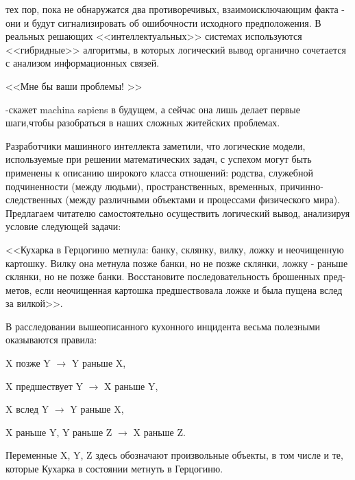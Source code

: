 \hspace{0.3cm}
\begin{minipage}{0.3\textwidth}

тех пор, пока не обнаружатся два противоречивых, взаимоисключающим факта -
они и будут сигнализировать об ошибочности исходного предположения.
  В реальных решающих <<интеллектуальных>> системах используются <<гибридные>> алгоритмы, в которых логический вывод органично сочетается с анализом информационных связей.

\vspace{0.3cm}
\hline
\vspace{0.09cm}
\large{
<<Мне бы ваши проблемы! >>
}
\hline
\vspace{0.15cm}

\small
\hspace{0.1cm}  -скажет machina sapiens в будущем, а сейчас она лишь делает первые шаги,чтобы разобраться в наших сложных житейских проблемах.

\hspace{0.1cm}   Разработчики машинного интеллекта
заметили, что логические модели, используемые при решении математических задач, с успехом могут быть применены к 
описанию широкого класса отношений:
родства, служебной подчиненности (между людьми), пространственных, временных, причинно-следственных (между различными объектами и процессами физического мира). Предлагаем читателю самостоятельно осуществить логический вывод, анализируя условие следующей
задачи:

\hspace{0.1cm}  <<Кухарка в Герцогиню метнула: банку,
склянку, вилку, ложку и неочищенную
картошку. Вилку она метнула позже банки, но не позже склянки, ложку - раньше склянки, но не позже банки. Восстановите последовательность брошенных пред-
метов, если неочищенная картошка предшествовала ложке и была пущена вслед за вилкой>>.

\hspace{0.1cm} В расследовании вышеописанного кухонного инцидента весьма полезными оказываются правила:


X позже Y $\rightarrow$ Y раньше X, 


X предшествует Y $\rightarrow$ X раньше Y, 


X вслед Y $\rightarrow$ Y раньше X, 


X раньше Y, Y раньше Z $\rightarrow$ X раньше Z.

\vspace{0.1cm}
\hspace{0.1cm} Переменные X, Y, Z здесь обозначают
произвольные объекты, в том числе и те, которые Кухарка в состоянии метнуть в Герцогиню.



\end{minipage}
